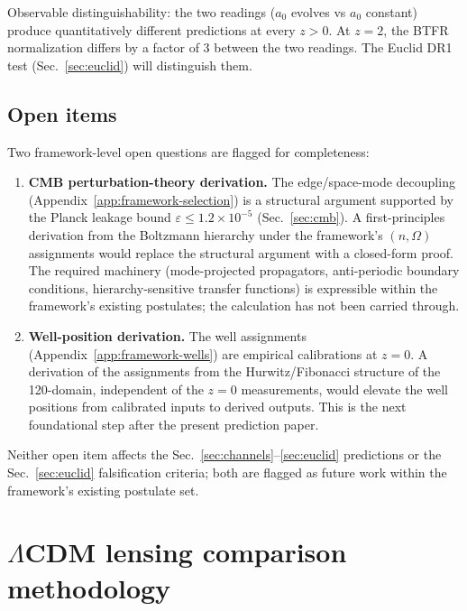 \documentclass[
    aps,
    prd,
    reprint,
    superscriptaddress,
    nofootinbib,
    floatfix
]{revtex4-2}
\begin{document}
Observable distinguishability: the two readings ($a_0$ evolves vs
$a_0$ constant) produce quantitatively different predictions at
every $z > 0$. At $z = 2$, the BTFR normalization differs by a
factor of 3 between the two readings. The Euclid DR1 test
(Sec.~\ref{sec:euclid}) will distinguish them.

\subsection{Open items}
\label{app:framework-open}

Two framework-level open questions are flagged for completeness:

\begin{enumerate}
\item \textbf{CMB perturbation-theory derivation.} The edge/space-mode
decoupling (Appendix~\ref{app:framework-selection}) is a structural
argument supported by the Planck leakage bound
$\varepsilon \leq 1.2 \times 10^{-5}$ (Sec.~\ref{sec:cmb}). A
first-principles derivation from the Boltzmann hierarchy under the
framework's $(n, \Omega)$ assignments would replace the structural
argument with a closed-form proof. The required machinery
(mode-projected propagators, anti-periodic boundary conditions,
hierarchy-sensitive transfer functions) is expressible within the
framework's existing postulates; the calculation has not been
carried through.

\item \textbf{Well-position derivation.} The well assignments
(Appendix~\ref{app:framework-wells}) are empirical calibrations at
$z = 0$. A derivation of the assignments from the
Hurwitz/Fibonacci structure of the 120-domain, independent of the
$z = 0$ measurements, would elevate the well positions from
calibrated inputs to derived outputs. This is the next foundational
step after the present prediction paper.
\end{enumerate}

Neither open item affects the
Sec.~\ref{sec:channels}--\ref{sec:euclid} predictions or the
Sec.~\ref{sec:euclid} falsification criteria; both are flagged as
future work within the framework's existing postulate set.

\section{$\Lambda$CDM lensing comparison methodology}
\label{app:lensing}
\end{document}
